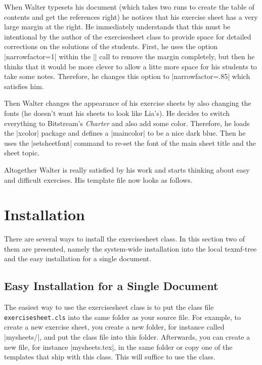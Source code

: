 \documentclass[a4paper,fleqn]{report}
\def\exercisesheet{{exercisesheet}}
\begin{document}


\noindent When Walter typesets his document (which takes two runs to
create the table of contents and get the references right) he notices
that his exercise sheet has a very large margin at the right. He
immediately understands that this must be intentional by the author of
the \exercisesheet{} class to provide space for detailed corrections
on the solutions of the students. First, he uses the option
|narrowfactor=1| within the |\sheetconf| call to remove the margin
completely, but then he thinks that it would be more clever to allow a
litte more space for his students to take some notes. Therefore, he
changes this option to |narrowfactor=.85| which satisfies him.



\noindent Then Walter changes the appearance of his exercise sheets by
also changing the fonts (he doesn't want his sheets to look like
Lia's). He decides to switch everything to Bitstream's \emph{Charter}
and also add some color. Therefore, he loads the |xcolor| package and
defines a |maincolor| to be a nice dark blue. Then he uses the
|setsheetfont| command to re-set the font of the main sheet title and
the sheet topic.



\noindent Altogether Walter is really satisfied by his work and starts
thinking about easy and difficult exercises. His template file now
looks as follows.




\chapter{Installation}

There are several ways to install the \exercisesheet{} class. In this
section two of them are presented, namely the system-wide installation
into the local texmf-tree and the easy installation for a single
document.


\section{Easy Installation for a Single Document}

The easiest way to use the \exercisesheet{} class is to put the class
file \lstinline[language=bash]|exercisesheet.cls| into the same folder
as your source file. For example, to create a new exercise sheet, you
create a new folder, for instance called |mysheets/|, and put the
class file into this folder. Afterwards, you can create a new file,
for instance |mysheets.tex|, in the same folder or copy one of the
templates that ship with this class. This will suffice to use the
class.
\end{document}
